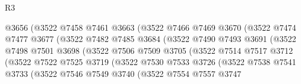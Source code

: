 \begin{lexlean}{R3}
\begin{coremodule}
                              @3656
                              (@3522
                                @7458
                                @7461
                                @3663
                                (@3522
                                  @7466
                                  @7469
                                  @3670
                                  (@3522
                                    @7474
                                    @7477
                                    @3677
                                    (@3522
                                      @7482
                                      @7485
                                      @3684
                                      (@3522
                                        @7490
                                        @7493
                                        @3691
                                        (@3522
                                          @7498
                                          @7501
                                          @3698
                                          (@3522
                                            @7506
                                            @7509
                                            @3705
                                            (@3522
                                              @7514
                                              @7517
                                              @3712
                                              (@3522
                                                @7522
                                                @7525
                                                @3719
                                                (@3522
                                                  @7530
                                                  @7533
                                                  @3726
                                                  (@3522
                                                    @7538
                                                    @7541
                                                    @3733
                                                    (@3522
                                                      @7546
                                                      @7549
                                                      @3740
                                                      (@3522
                                                        @7554
                                                        @7557
                                                        @3747

\end{coremodule}
\end{lexlean}
